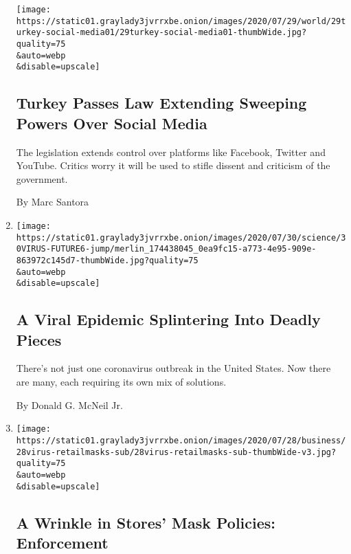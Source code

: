 \begin{enumerate}
  \texttt{[image: https://static01.graylady3jvrrxbe.onion/images/2020/07/29/world/29turkey-social-media01/29turkey-social-media01-thumbWide.jpg?quality=75\\\&auto=webp\\\&disable=upscale]}

  \hypertarget{turkey-passes-law-extending-sweeping-powers-over-social-media}{%
  \subsection{Turkey Passes Law Extending Sweeping Powers Over Social
  Media}\label{turkey-passes-law-extending-sweeping-powers-over-social-media}}

  The legislation extends control over platforms like Facebook, Twitter
  and YouTube. Critics worry it will be used to stifle dissent and
  criticism of the government.

  By Marc Santora
\item
  \href{/2020/07/29/health/coronavirus-future-america.html}{}

  \texttt{[image: https://static01.graylady3jvrrxbe.onion/images/2020/07/30/science/30VIRUS-FUTURE6-jump/merlin\_174438045\_0ea9fc15-a773-4e95-909e-863972c145d7-thumbWide.jpg?quality=75\\\&auto=webp\\\&disable=upscale]}

  \hypertarget{a-viral-epidemic-splintering-into-deadly-pieces}{%
  \subsection{A Viral Epidemic Splintering Into Deadly
  Pieces}\label{a-viral-epidemic-splintering-into-deadly-pieces}}

  There's not just one coronavirus outbreak in the United States. Now
  there are many, each requiring its own mix of solutions.

  By Donald G. McNeil Jr.
\item
  \href{/2020/07/29/business/coronavirus-masks-stores-walmart.html}{}

  \texttt{[image: https://static01.graylady3jvrrxbe.onion/images/2020/07/28/business/28virus-retailmasks-sub/28virus-retailmasks-sub-thumbWide-v3.jpg?quality=75\\\&auto=webp\\\&disable=upscale]}

  \hypertarget{a-wrinkle-in-stores-mask-policies-enforcement}{%
  \subsection{A Wrinkle in Stores' Mask Policies:
  Enforcement}\label{a-wrinkle-in-stores-mask-policies-enforcement}}


\end{enumerate}
